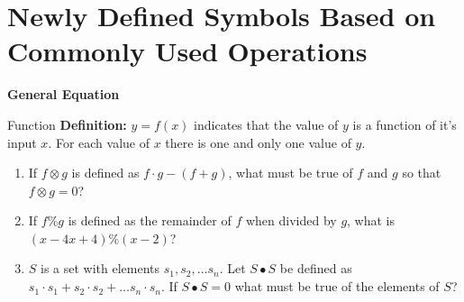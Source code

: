 \section[New Symbols]{\sloppy Newly Defined Symbols Based on Commonly Used Operations}
\bigskip
\textbf{General Equation} 

\bigskip
\begin{equationbox}{Function}
\textbf{Definition:} $y=f(x)$ indicates that the value of $y$ is a function of it's input $x$. For each value of $x$ there is one and only one value of $y$.
\end{equationbox}

\bigskip
\begin{enumerate}[labelindent=*,style=multiline,leftmargin=*,label=\textbf{Example \arabic*:}]
\item If $f\otimes g$ is defined as $f\cdot g-(f+g)$, what must be true of $f$ and $g$ so that $f\otimes g=0$?

\vfill\item If $f\%g$ is defined as the remainder of $f$ when divided by $g$, what is $(x-4x+4)\%(x-2)$?

\vfill\item $S$ is a set with elements $s_1, s_2,\ldots s_n$. Let $S\bullet S$ be defined as $s_1\cdot s_1+s_2\cdot s_2+\ldots s_n\cdot s_n$. If $S\bullet S=0$ what must be true of the elements of $S$?
\end{enumerate}

